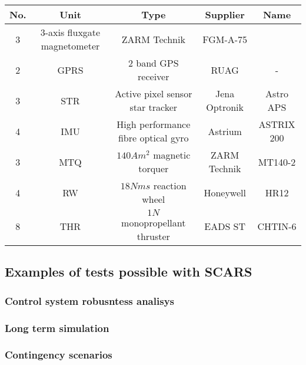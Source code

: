     \begin{center}    
        \begin{tabular}{ c c c c c }
            No. & Unit & Type & Supplier & Name \\ \hline
            3 & 3-axis fluxgate magnetometer & ZARM Technik & FGM-A-75 \\
            2 & GPRS & 2 band GPS receiver & RUAG & - \\
            3 & STR  & Active pixel sensor star tracker & Jena Optronik & Astro APS \\
            4 & IMU & High performance fibre optical gyro & Astrium & ASTRIX 200 \\
            3 & MTQ & $140 Am^2$ magnetic torquer & ZARM Technik & MT140-2\\
            4 & RW & $18 Nms$ reaction wheel & Honeywell & HR12 \\
            8 & THR & $1N$ monopropellant thruster & EADS ST &CHTIN-6
        \end{tabular}
    \end{center}\label{table:sentinel-adcs}

\subsection{Examples of tests possible with SCARS}

\subsubsection{Control system robusntess analisys}

\subsubsection{Long term simulation}

\subsubsection{Contingency scenarios}
